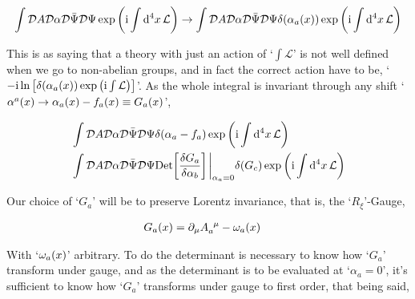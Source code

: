 \begin{align}
    \int\mathcal D A\mathcal D \alpha\mathcal D \bar\Psi\mathcal D \Psi\exp\qty(\textnormal{i}\int\dd[4]{x}\mathcal L)\rightarrow\int\mathcal D A\mathcal D \alpha\mathcal D \bar\Psi\mathcal D \Psi\delta\qty(\alpha_a\qty(x))\exp\qty(\textnormal{i}\int\dd[4]{x}\mathcal L)\nonumber
\end{align}

This is as saying that a theory with just an action of `$\int\mathcal L$' is not well defined when we go to non-abelian groups, and in fact the correct action have to be, `$-\textnormal{i}\ln\qty[\delta\qty(\alpha_a\qty(x))\exp\qty(\textnormal{i}\int\mathcal L)]$'. As the whole integral is invariant through any shift `$\alpha^a\qty(x)\rightarrow\alpha_a\qty(x)-f_a\qty(x)\equiv G_a\qty(x)$',

\begin{align}
    &\int\Dd{A}\Dd{\alpha}\Dd{\bar\Psi}\Dd{\Psi}\delta\qty(\alpha_a-f_a)\exp\qty(\im\int\dd[4]{x}\mathcal L)\nonumber\\
    &\int\Dd{A}\Dd{\alpha}\Dd{\bar\Psi}\Dd{\Psi}\Det\qty[\fdv{G_a}{\alpha_b}]\eval_{\alpha_a=0}\delta\qty(G_c)\exp\qty(\im\int\dd[4]{x}\mathcal L)\nonumber
\end{align}

Our choice of `$G_a$' will be to preserve Lorentz invariance, that is, the `$R_\xi$'-Gauge, 

\begin{align}
    G_a\qty(x)&=\partial_\mu\tensor{A}{_a^\mu}-\omega_a\qty(x)\nonumber
\end{align}

With `$\omega_a\qty(x)$' arbitrary. To do the determinant is necessary to know how `$G_a$' transform under gauge, and as the determinant is to be evaluated at `$\alpha_a=0$', it's sufficient to know how `$G_a$' transforms under gauge to first order, that being said,

